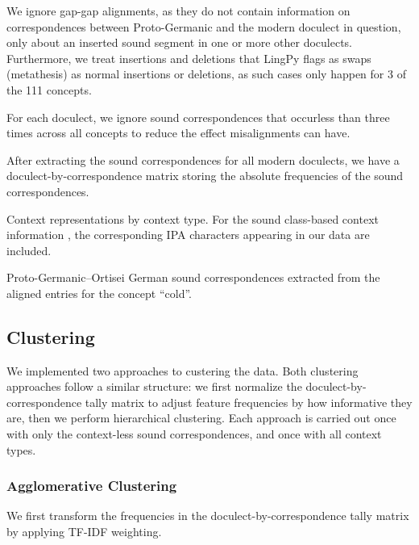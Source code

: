 \documentclass[a4paper]{article}
\begin{document}
We ignore gap-gap alignments,
as they do not contain information on correspondences
between Proto-Germanic and the modern doculect in question,
only about an inserted sound segment in one or more other doculects.
Furthermore, we treat insertions and deletions
that LingPy flags as swaps (metathesis) as normal insertions or deletions,
as such cases only happen for 3 of the 111 concepts.

For each doculect, we ignore sound correspondences
that occurless than three times across all concepts
to reduce the effect misalignments can have. 

After extracting the sound correspondences for
all modern doculects, we have a doculect-by-correspondence
matrix storing the absolute frequencies of the sound correspondences.

\begin{table}[]

\caption
[Context representations by context type]
{Context representations by context type.
For the sound class-based context information
\citep{list2012sca}, the corresponding IPA characters
appearing in our data are included.}
\label{tab:context}
\end{table}

\begin{table}[h]

\caption{
Proto-Germanic--Ortisei German sound correspondences
extracted from the aligned entries for the concept ``cold''.}
\label{tab:corres}
\end{table}


\subsection{Clustering}
\label{subsec:clustering}

We implemented two approaches to custering the data.
Both clustering approaches follow a similar structure:
we first normalize the doculect-by-correspondence tally matrix
to adjust feature frequencies by how informative they are,
then we perform hierarchical clustering.
Each approach is carried out once with only
the context-less sound correspondences,
and once with all context types.

\subsubsection{Agglomerative Clustering}
\label{subsubsec:upgma}

We first transform the frequencies
in the doculect-by-correspondence tally matrix
by applying TF-IDF weighting.
\end{document}
